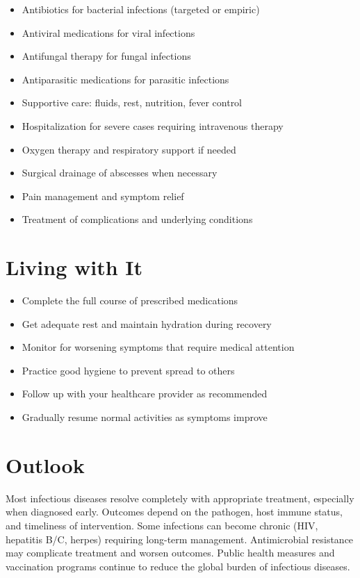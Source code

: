 \begin{itemize}[noitemsep]
  \item Antibiotics for bacterial infections (targeted or empiric)
  \item Antiviral medications for viral infections
  \item Antifungal therapy for fungal infections
  \item Antiparasitic medications for parasitic infections
  \item Supportive care: fluids, rest, nutrition, fever control
  \item Hospitalization for severe cases requiring intravenous therapy
  \item Oxygen therapy and respiratory support if needed
  \item Surgical drainage of abscesses when necessary
  \item Pain management and symptom relief
  \item Treatment of complications and underlying conditions
\end{itemize}
\section{Living with It}
\begin{itemize}[noitemsep]
  \item Complete the full course of prescribed medications
  \item Get adequate rest and maintain hydration during recovery
  \item Monitor for worsening symptoms that require medical attention
  \item Practice good hygiene to prevent spread to others
  \item Follow up with your healthcare provider as recommended
  \item Gradually resume normal activities as symptoms improve
\end{itemize}
\section{Outlook}
Most infectious diseases resolve completely with appropriate treatment, especially when diagnosed early. Outcomes depend on the pathogen, host immune status, and timeliness of intervention. Some infections can become chronic (HIV, hepatitis B/C, herpes) requiring long-term management. Antimicrobial resistance may complicate treatment and worsen outcomes. Public health measures and vaccination programs continue to reduce the global burden of infectious diseases.
